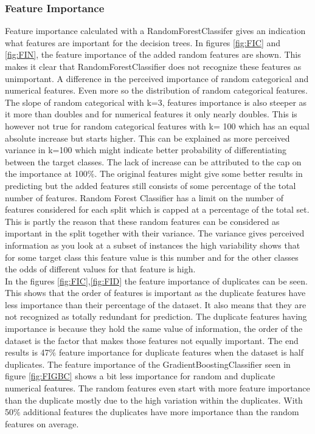\documentclass[a4paper,10pt]{article}
\begin{document}
\subsubsection{Feature Importance}\label{chapter312}
Feature importance calculated with a RandomForestClassifer gives an indication what features are important for the decision trees. In figures \ref{fig:FIC} and \ref{fig:FIN}, the feature importance of the added random features are shown. This makes it clear that RandomForestClassifier does not recognize these features as unimportant. A difference in the perceived importance of random categorical and numerical features. Even more so the distribution of random categorical features. The slope of random categorical with k=3, features importance is also steeper as it more than doubles and for numerical features it only nearly doubles. This is however not true for random categorical features with k= 100 which has an equal absolute increase but starts higher. This can be explained as more perceived variance in k=100 which might indicate better probability of differentiating between the target classes. The lack of increase can be attributed to the cap on the importance at 100$\%$. The original features might give some better results in predicting but the added features still consists of some percentage of the total number of features. Random Forest Classifier has a limit on the number of features considered for each split which is capped at a percentage of the total set. This is partly the reason that these random features can be considered as important in the split together with their variance. The variance gives perceived information as you look at a subset of instances the high variability shows that for some target class this feature value is this number and for the other classes the odds of different values for that feature is high. 
\\

In the figures \ref{fig:FIC},\ref{fig:FID} the feature importance of duplicates can be seen. This shows that the order of features is important as the duplicate features have less importance than their percentage of the dataset. It also means that they are not recognized as totally redundant for prediction. The duplicate features having importance is because they hold the same value of information, the order of the dataset is the factor that makes those features not equally important. The end results is 47$\%$ feature importance for duplicate features when the dataset is half duplicates. The feature importance of the GradientBoostingClassifier seen in figure \ref{fig:FIGBC} shows a bit less importance for random and duplicate numerical features. The random features even start with more feature importance than the duplicate mostly due to the high variation within the duplicates. With 50$\%$ additional features the duplicates have more importance than the random features on average. 
\end{document}
